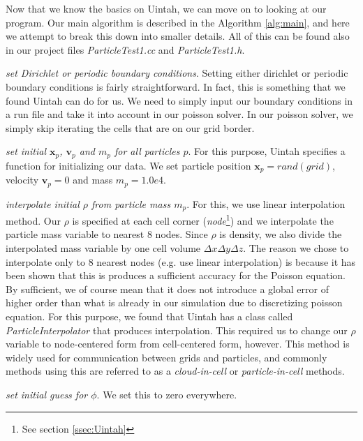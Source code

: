 \documentclass[notitlepage, 12pt]{article}
\begin{document}
Now that we know the basics on Uintah, we can move on to looking at our program. Our main algorithm is described in the Algorithm \ref{alg:main}, 
and here we attempt to break this down into smaller details. All of this can 
be found also in our project files \emph{ParticleTest1.cc} and 
\emph{ParticleTest1.h}.

\emph{set Dirichlet or periodic boundary conditions}. Setting either dirichlet or periodic boundary conditions is fairly straightforward. 
In fact, this is something that we found Uintah can do for us. We need to 
simply input our boundary conditions in a run file and take it into account 
in our poisson solver. In our poisson solver, we simply skip iterating the 
cells that are on our grid border.

\emph{set initial $\mathbf{x}_p$, $\mathbf{v}_p$ and $m_p$ for all particles $p$}. 
For this purpose, Uintah specifies a function for initializing our data. We 
set particle position $\mathbf{x}_p=rand(grid)$, velocity $\mathbf{v}_p=0$ and mass $m_p = 1.0e4$. 

\emph{interpolate initial $\rho$ from particle mass $m_p$}. For this, we use 
linear interpolation method. Our $\rho$ is specified at each cell corner 
(\emph{node}\footnote{See section \ref{ssec:Uintah}}) and we interpolate 
the particle mass variable to nearest $8$ nodes. Since $\rho$ is density, we 
also divide the interpolated mass variable by one cell volume $\Delta x \Delta y \Delta z$. 
The reason we chose to interpolate only to $8$ nearest nodes (e.g. 
use linear interpolation) is because it has 
been shown that this is produces a sufficient accuracy 
for the Poisson equation\citep{linearinterpolation}. By sufficient, 
we of course mean that it does not introduce a global error of higher order 
than what is already in our simulation due to discretizing poisson equation.
For this purpose, we 
found that Uintah has a class called \emph{ParticleInterpolator} that 
produces interpolation. This required us to change our $\rho$ variable to 
node-centered form from cell-centered form, however. This method is widely 
used for communication between grids and particles, and commonly methods 
using this are referred to as a \emph{cloud-in-cell} or \emph{particle-in-cell} 
methods.

\emph{set initial guess for $\phi$}. We set this to zero everywhere.
\end{document}
